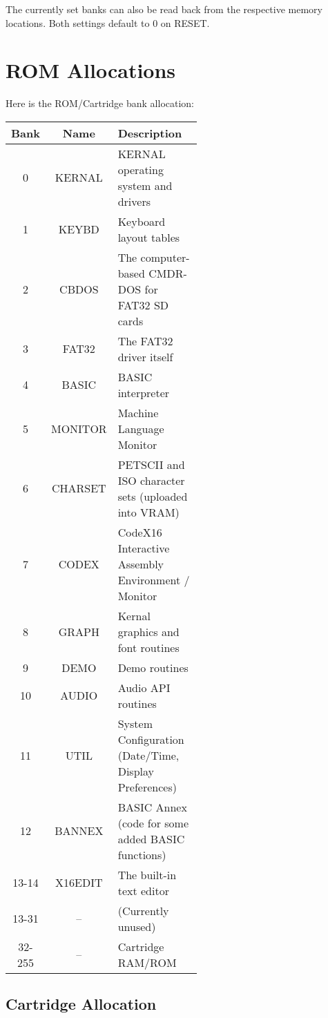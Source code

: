 The currently set banks can also be read back from the respective memory locations. Both settings default to 0 on RESET.\\

\section{ROM Allocations}

Here is the ROM/Cartridge bank allocation:\\

\begin{tabular}{|c|c|p{0.55\linewidth}|}
	\hline
	{\bfseries Bank}   & {\bfseries Name}    & {\bfseries Description}\\ \hline
	0      & KERNAL  & KERNAL operating system and drivers\\ \hline
	1      & KEYBD   & Keyboard layout tables\\ \hline
	2      & CBDOS   & The computer-based CMDR-DOS for FAT32 SD cards\\ \hline
	3      & FAT32   & The FAT32 driver itself\\ \hline
	4      & BASIC   & BASIC interpreter\\ \hline
	5      & MONITOR & Machine Language Monitor\\ \hline
	6      & CHARSET & PETSCII and ISO character sets (uploaded into VRAM)\\ \hline
	7      & CODEX   & CodeX16 Interactive Assembly Environment / Monitor\\ \hline
	8      & GRAPH   & Kernal graphics and font routines\\ \hline
	9      & DEMO    & Demo routines\\ \hline
	10     & AUDIO   & Audio API routines\\ \hline
	11     & UTIL    & System Configuration (Date/Time, Display Preferences)\\ \hline
	12     & BANNEX  & BASIC Annex (code for some added BASIC functions)\\ \hline
	13-14  & X16EDIT & The built-in text editor\\ \hline
	13-31  & –       & (Currently unused)\\ \hline
	32-255 & –       & Cartridge RAM/ROM\\ \hline
\end{tabular}

\vspace{16pt}

\subsection{Cartridge Allocation}

